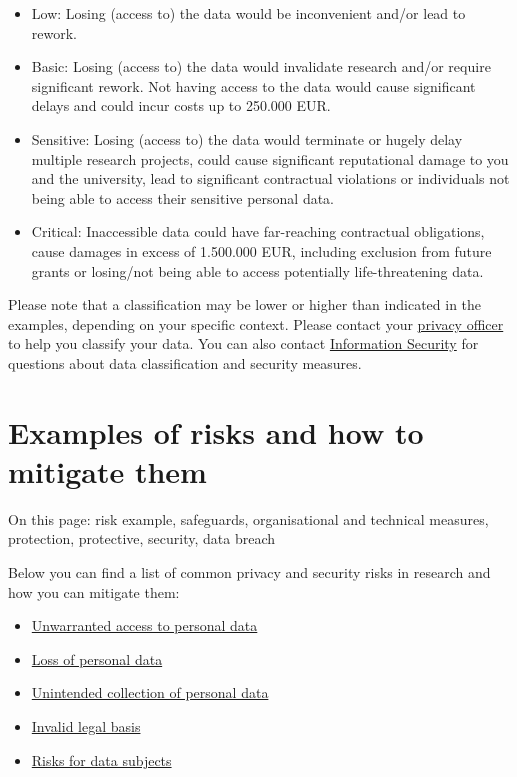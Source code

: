 \documentclass[
]{book}
\providecommand{\tightlist}{%
  \setlength{\itemsep}{0pt}\setlength{\parskip}{0pt}}
\begin{document}
\begin{itemize}
\tightlist
\item
  Low: Losing (access to) the data would be inconvenient and/or lead to rework.
\item
  Basic: Losing (access to) the data would invalidate research and/or require
  significant rework. Not having access to the data would cause significant delays
  and could incur costs up to 250.000 EUR.
\item
  Sensitive: Losing (access to) the data would terminate or hugely delay
  multiple research projects, could cause significant reputational damage to you
  and the university, lead to significant contractual violations or individuals
  not being able to access their sensitive personal data.
\item
  Critical: Inaccessible data could have far-reaching contractual obligations,
  cause damages in excess of 1.500.000 EUR, including exclusion from future grants
  or losing/not being able to access potentially life-threatening data.
\end{itemize}

Please note that a classification may be lower or higher than indicated in the
examples, depending on your specific context. Please contact your
\protect\hyperlink{support}{privacy officer} to help you classify your data. You can also
contact \protect\hyperlink{support}{Information Security} for questions about data classification
and security measures.

\hypertarget{example-risks}{%
\section{Examples of risks and how to mitigate them}\label{example-risks}}

On this page: risk example, safeguards, organisational and technical measures,
protection, protective, security, data breach

Below you can find a list of common privacy and security risks in research and
how you can mitigate them:

\begin{itemize}
\tightlist
\item
  \protect\hyperlink{unwarranted-access}{Unwarranted access to personal data}
\item
  \protect\hyperlink{loss-of-personal-data}{Loss of personal data}
\item
  \protect\hyperlink{unintended-collection}{Unintended collection of personal data}
\item
  \protect\hyperlink{invalid-legal-basis}{Invalid legal basis}
\item
  \protect\hyperlink{risks-data-subjects}{Risks for data subjects}
\end{itemize}
\end{document}
